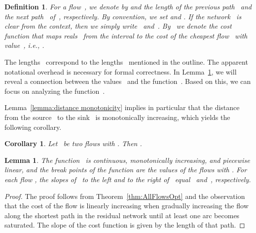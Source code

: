 \documentclass[11pt]{article}
\newtheorem{lemma}[theorem]{Lemma}
\newtheorem{definition}[theorem]{Definition}
\newtheorem{corollary}[theorem]{Corollary}
\begin{document}
\begin{definition}
For a flow~, we denote by  and  the length of the previous path~ and the next path~ of~, respectively. By convention, we set  and . If the network~ is clear from the context, then we simply write~ and~. By~ we denote the cost function that maps reals~ from the interval  to the cost of the cheapest flow~ with value~, i.e., .
\end{definition}

The lengths~ correspond to the lengths~ mentioned in the outline. The apparent notational overhead is necessary for formal correctness. In Lemma~\ref{lemma:cost function form}, we will reveal a connection between the values~ and the function~. Based on this, we can focus on analyzing the function~.

Lemma~\ref{lemma:distance monotonicity} implies in particular that the distance from the source~
to the sink~ is monotonically increasing, which yields the following corollary. 
\begin{corollary}\label{corollary:path monotonicity}
Let~ be two flows with . Then .
\end{corollary}



\begin{lemma}
\label{lemma:cost function form}
The function~ is continuous, monotonically increasing, and piecewise linear, and the break points of the function are the values of the flows  with . For each flow , the slopes of~ to the left and to the right of~ equal~ and~, respectively.
\end{lemma}

\begin{proof}
The proof follows from Theorem~\ref{thm:AllFlowsOpt} and the observation that the cost of the flow is linearly increasing when gradually increasing the flow along the shortest path in the residual network until at least one arc becomes saturated. The slope of the cost function is given by the length of that path. \end{proof}
\end{document}
